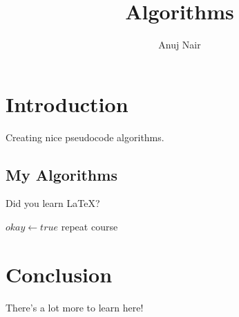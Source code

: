 \documentclass{article}
\title{Algorithms}
\author{Anuj Nair}
\date{}
\begin{document}
\maketitle

\section{Introduction}

	Creating nice pseudocode algorithms.

	\subsection{My Algorithms}
	Did you learn {\LaTeX}?
	\begin{algorithmic}
				\State $okay \gets true$
			\Else
					\State repeat course
				\EndWhile
		\EndIf
	\end{algorithmic}
				
\section{Conclusion}

 There's a lot more to learn here!
\end{document}
